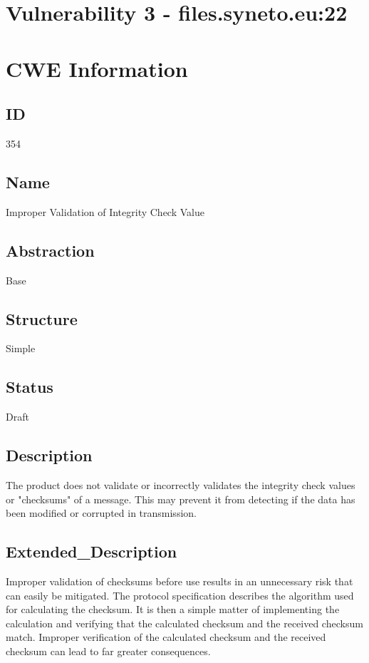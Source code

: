 \section*{Vulnerability 3 - files.syneto.eu:22}

\section*{CWE Information}
\subsection*{ID}
354

\subsection*{Name}
Improper Validation of Integrity Check Value

\subsection*{Abstraction}
Base

\subsection*{Structure}
Simple

\subsection*{Status}
Draft

\subsection*{Description}
The product does not validate or incorrectly validates the integrity check values or "checksums" of a message. This may prevent it from detecting if the data has been modified or corrupted in transmission.

\subsection*{Extended\_Description}
Improper validation of checksums before use results in an unnecessary risk that can easily be mitigated. The protocol specification describes the algorithm used for calculating the checksum. It is then a simple matter of implementing the calculation and verifying that the calculated checksum and the received checksum match. Improper verification of the calculated checksum and the received checksum can lead to far greater consequences.

